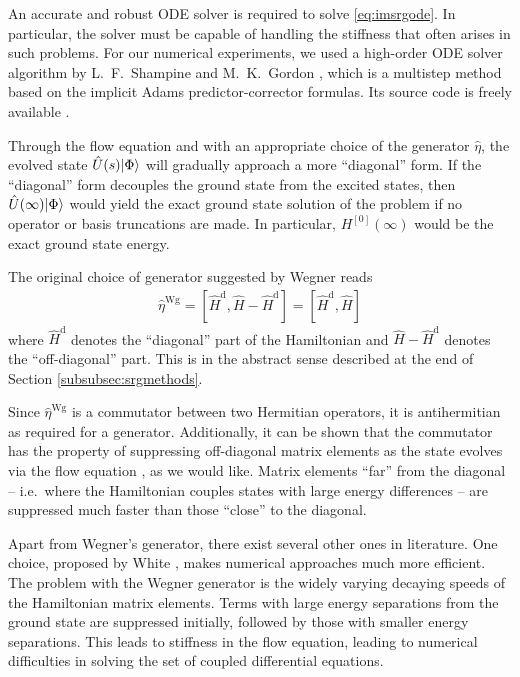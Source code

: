 An accurate and robust ODE solver is required to solve \eqref{eq:imsrgode}.  In particular, the solver must be capable of handling the stiffness that often arises in such problems.  For our numerical experiments, we used a high-order ODE solver algorithm by L.\ F.\ Shampine and M.\ K.\ Gordon \cite{shampine1975computer}, which is a multistep method based on the implicit Adams predictor-corrector formulas.  Its source code is freely available \cite{odesolver}.

Through the flow equation and with an appropriate choice of the generator $\hat{\eta}$, the evolved state $\hat U(s) | \Phi \rangle$ will gradually approach a more ``diagonal'' form.  If the ``diagonal'' form decouples the ground state from the excited states, then $\hat U(\infty) | \Phi \rangle$ would yield the exact ground state solution of the problem if no operator or basis truncations are made.  In particular, $H^{[0]}(\infty)$ would be the exact ground state energy.

The original choice of generator suggested by Wegner \cite{Wegner200177} reads
\begin{align*}
  \hat{\eta}^{\text{Wg}}
  = [\hat{H}^{\text{d}}, \hat{H} - \hat{H}^{\text{d}}]
  = [\hat{H}^{\text{d}}, \hat{H}]
\end{align*}
where $\hat{H}^{\text{d}}$ denotes the ``diagonal'' part of the Hamiltonian and $\hat{H} - \hat{H}^{\text{d}}$ denotes the ``off-diagonal'' part.  This is in the abstract sense described at the end of Section \ref{subsubsec:srgmethods}.

Since $\hat{\eta}^{\text{Wg}}$ is a commutator between two Hermitian operators, it is antihermitian as required for a generator.  Additionally, it can be shown that the commutator has the property of suppressing off-diagonal matrix elements as the state evolves via the flow equation \cite{kehrein2006flow}, as we would like.  Matrix elements ``far'' from the diagonal -- i.e.\ where the Hamiltonian couples states with large energy differences -- are suppressed much faster than those ``close'' to the diagonal.

Apart from Wegner's generator, there exist several other ones in literature. One choice, proposed by White \cite{White:cond-mat0201346}, makes numerical approaches much more efficient.  The problem with the Wegner generator is the widely varying decaying speeds of the Hamiltonian matrix elements.  Terms with large energy separations from the ground state are suppressed initially, followed by those with smaller energy separations.  This leads to stiffness in the flow equation, leading to numerical difficulties in solving the set of coupled differential equations.

